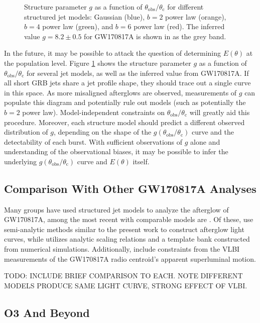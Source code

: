 \documentclass[twocolumn]{aastex62}
\newcommand{\gwbns}{GW170817A}
\newcommand{\thobs}{\ensuremath{\theta_{\mathrm{obs}}}}
\newcommand{\thC}{\ensuremath{\theta_{\mathrm{c}}}}
\begin{document}
\begin{figure}
	\caption{Structure parameter $g$ as a function of $\thobs/\thC$ for different structured jet models: Gaussian (blue), $b=2$ power law (orange), $b=4$ power law (green), and $b=6$ power law (red).  The inferred value $g = 8.2\pm0.5$ for \gwbns{} is shown in as the grey band. \label{fig:gPop}}
\end{figure}

In the future, it may be possible to attack the question of determining $E(\theta)$ at the population level.  Figure \ref{fig:gPop} shows the structure parameter $g$ as a function of $\thobs/\thC$ for several jet models, as well as the inferred value from \gwbns{}.  If all short GRB jets share a jet profile shape, they should trace out a single curve in this space.  As more misaligned afterglows are observed, measurements of $g$ can populate this diagram and potentially rule out models (such as potentially the $b=2$ power law).  Model-independent constraints on $\thobs/\thC$ will greatly aid this procedure.  Moreover, each structure model should predict a different observed distribution of $g$, depending on the shape of the $g(\thobs/\thC)$ curve and the detectability of each burst.  With sufficient observations of $g$ alone and understanding of the observational biases, it may be possible to infer the underlying $g(\thobs/\thC)$ curve and $E(\theta)$ itself.

\subsection{Comparison With Other \gwbns{} Analyses}


Many groups have used structured jet models to analyze the afterglow of \gwbns{}, among the most recent with comparable models are \citet{Hotokezaka:2018aa, Ghirlanda:2019aa, Lamb:2019aa, Wu:2018aa}.  Of these, \citet{Hotokezaka:2018aa, Ghirlanda:2019aa, Lamb:2019aa} use semi-analytic methods similar to the present work to construct afterglow light curves, while \citet{Wu:2018aa} utilizes analytic scaling relations and a template bank constructed from numerical simulations.  Additionally, \citet{Hotokezaka:2018aa, Ghirlanda:2019aa} include constraints from the VLBI measurements of the \gwbns{} radio centroid's apparent superluminal motion.

TODO: INCLUDE BRIEF COMPARISON TO EACH.  NOTE DIFFERENT MODELS PRODUCE SAME LIGHT CURVE, STRONG EFFECT OF VLBI.

\subsection{O3 And Beyond}
\end{document}
